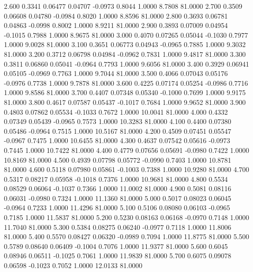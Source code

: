    2.600   0.3341   0.06477   0.04707  -0.0973   0.8044   1.0000   8.7808  81.0000
   2.700   0.3509   0.06608   0.04780  -0.0984   0.8020   1.0000   8.8596  81.0000
   2.800   0.3693   0.06781   0.04863  -0.0998   0.8002   1.0000   8.9211  81.0000
   2.900   0.3893   0.07009   0.04954  -0.1015   0.7988   1.0000   8.9675  81.0000
   3.000   0.4070   0.07265   0.05044  -0.1030   0.7977   1.0000   9.0028  81.0000
   3.100   0.3651   0.06773   0.04943  -0.0965   0.7885   1.0000   9.3032  81.0000
   3.200   0.3712   0.06798   0.04984  -0.0962   0.7831   1.0000   9.4817  81.0000
   3.300   0.3811   0.06860   0.05041  -0.0964   0.7793   1.0000   9.6056  81.0000
   3.400   0.3929   0.06941   0.05105  -0.0969   0.7763   1.0000   9.7044  81.0000
   3.500   0.4066   0.07043   0.05176  -0.0976   0.7738   1.0000   9.7878  81.0000
   3.600   0.4225   0.07174   0.05254  -0.0986   0.7716   1.0000   9.8586  81.0000
   3.700   0.4407   0.07348   0.05340  -0.1000   0.7699   1.0000   9.9175  81.0000
   3.800   0.4617   0.07587   0.05437  -0.1017   0.7684   1.0000   9.9652  81.0000
   3.900   0.4803   0.07862   0.05534  -0.1033   0.7672   1.0000  10.0041  81.0000
   4.000   0.4332   0.07349   0.05439  -0.0965   0.7573   1.0000  10.3283  81.0000
   4.100   0.4400   0.07380   0.05486  -0.0964   0.7515   1.0000  10.5167  81.0000
   4.200   0.4509   0.07451   0.05547  -0.0967   0.7475   1.0000  10.6455  81.0000
   4.300   0.4637   0.07542   0.05616  -0.0973   0.7445   1.0000  10.7422  81.0000
   4.400   0.4779   0.07656   0.05691  -0.0980   0.7422   1.0000  10.8169  81.0000
   4.500   0.4939   0.07798   0.05772  -0.0990   0.7403   1.0000  10.8781  81.0000
   4.600   0.5118   0.07980   0.05861  -0.1003   0.7388   1.0000  10.9280  81.0000
   4.700   0.5317   0.08217   0.05958  -0.1018   0.7376   1.0000  10.9681  81.0000
   4.800   0.5534   0.08529   0.06064  -0.1037   0.7366   1.0000  11.0002  81.0000
   4.900   0.5081   0.08116   0.06031  -0.0980   0.7324   1.0000  11.1360  81.0000
   5.000   0.5017   0.08023   0.06045  -0.0964   0.7233   1.0000  11.4296  81.0000
   5.100   0.5106   0.08080   0.06103  -0.0965   0.7185   1.0000  11.5837  81.0000
   5.200   0.5230   0.08163   0.06168  -0.0970   0.7148   1.0000  11.7040  81.0000
   5.300   0.5384   0.08275   0.06240  -0.0977   0.7118   1.0000  11.8006  81.0000
   5.400   0.5570   0.08427   0.06320  -0.0989   0.7094   1.0000  11.8775  81.0000
   5.500   0.5789   0.08640   0.06409  -0.1004   0.7076   1.0000  11.9377  81.0000
   5.600   0.6045   0.08946   0.06511  -0.1025   0.7061   1.0000  11.9839  81.0000
   5.700   0.6075   0.09078   0.06598  -0.1023   0.7052   1.0000  12.0133  81.0000

